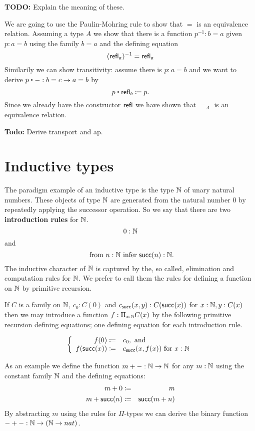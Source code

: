 \textbf{TODO:} Explain the meaning of these.

We are going to use the Paulin-Mohring rule to show that $=$ is an
equivalence relation. Assuming a type $A$ we show that there is a function
$p^{-1} : b = a$ given $p : a = b$ using the family $b = a$ and
the defining equation
\[ (\mathsf{refl}_{a})^{-1} = \mathsf{refl}_{a} \]
Similarily we can show transitivity: assume there is $p : a = b$ and
we want to derive $p \ct - : b = c \to a = b$ by
\[ p \ct \refl{b} \defeq p.\]
Since we already have the constructor $\mathsf{refl}_{}$ we have shown that $=_A$
is an equivalence relation. 


\textbf{Todo:} Derive transport and ap.

\section{Inductive types}
\label{sec:inductive-types}

The paradigm example of an inductive type is the type $\mathbb{N}$ of unary natural numbers.  These objects of type $\mathbb{N}$ are generated from the natural number $0$ by repeatedly applying the successor operation.  So we say that there are two {\bf introduction rules} for $\mathbb{N}$. 
  \[ 0:\mathbb{N}\]
and
  \[ \mbox{ from $n:\mathbb{N}$ infer $\mathsf{succ}(n):\mathbb{N}$}.\]
The inductive character of $\mathbb{N}$ is captured by the, so called, elimination and computation rules for $\mathbb{N}$.  We prefer to call them the rules for defining a function on $\mathbb{N}$ by primitive recursion. 

If $C$ is a family on $\mathbb{N}$, $c_0:C(0)$ and $c_{\mathsf{succ}}(x,y):C(\mathsf{succ}(x))$ for $x:\mathbb{N},y:C(x)$ then we may introduce a function $f:\Pi_{x:\mathbb{N}}C(x)$ by the following primitive recursion defining equations; one defining equation for each introduction rule.

  \[\left\{\begin{array}{rl}
f(0)\coloneqq& c_0, \mbox{ and}\\
f(\mathsf{succ}(x))\coloneqq& c_{\mathsf{succ}}(x,f(x))\mbox{ for } x:\mathbb{N}
  \end{array}\right.\]

As an example we define the function $m + - : \mathbb{N} \to \mathbb{N}$ for any
$m : \mathbb{N}$ using the constant family $\mathbb{N}$ and the defining
equations:
\begin{eqnarray*}
  m + 0 & \coloneqq & m \\
  m + \mathsf{succ}(n) & \coloneqq & \mathsf{succ}(m + n)
\end{eqnarray*}
By abstracting $m$ using the rules for $\Pi$-types we can derive the
binary function $- + - : \mathbb{N} \to (\mathbb{N} \to nat)$.

